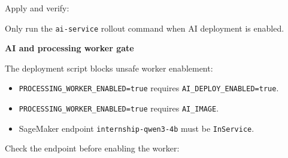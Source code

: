 Apply and verify:

\begin{Shaded}
\begin{Highlighting}[]
\OperatorTok{=}
\OperatorTok{=}
\OperatorTok{=}
\OperatorTok{=}
\OperatorTok{=}
\end{Highlighting}
\end{Shaded}

Only run the \texttt{ai-\allowbreak{}service} rollout command when AI deployment is
enabled.

\vspace{0.5em}\noindent\textbf{AI and processing worker
gate}\par

The deployment script blocks unsafe worker enablement:

\begin{itemize}
\tightlist
\item
  \texttt{PROCESSING\_\allowbreak{}WORKER\_\allowbreak{}ENABLED=true} requires
  \texttt{AI\_\allowbreak{}DEPLOY\_\allowbreak{}ENABLED=true}.
\item
  \texttt{PROCESSING\_\allowbreak{}WORKER\_\allowbreak{}ENABLED=true} requires \texttt{AI\_\allowbreak{}IMAGE}.
\item
  SageMaker endpoint \texttt{internship-\allowbreak{}qwen3-\allowbreak{}4b} must be
  \texttt{InService}.
\end{itemize}

Check the endpoint before enabling the worker:

\begin{Shaded}
\begin{Highlighting}[]
\DataTypeTok{\textbackslash{}}
  \DataTypeTok{\textbackslash{}}
  \DataTypeTok{\textbackslash{}}
  \DataTypeTok{\textbackslash{}}
\end{Highlighting}
\end{Shaded}

